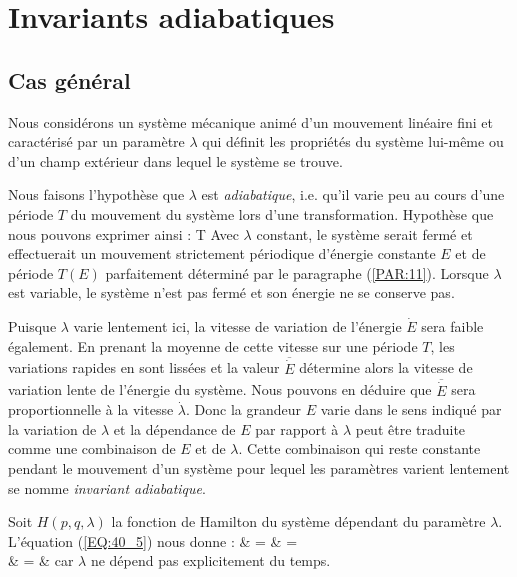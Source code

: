 \section{Invariants adiabatiques}\label{PAR:49}

\subsection{Cas g\'{e}n\'{e}ral}\label{PAR:49_1}

Nous consid\'{e}rons un syst\`{e}me m\'{e}canique anim\'{e} d'un mouvement lin\'{e}aire fini et caract\'{e}ris\'{e} par un param\`{e}tre $\lambda$ qui d\'{e}finit les propri\'{e}t\'{e}s du syst\`{e}me lui-m\^{e}me ou d'un champ ext\'{e}rieur dans lequel le syst\`{e}me se trouve.

Nous faisons l'hypoth\`{e}se que $\lambda$ est \emph{adiabatique}, i.e. qu'il varie peu au cours d'une p\'{e}riode $T$ du mouvement du syst\`{e}me lors d'une transformation. Hypoth\`{e}se que nous pouvons exprimer ainsi :
\be
	T \ll \lambda \label{EQ:49_1}
\ee
Avec $\lambda$ constant, le syst\`{e}me serait ferm\'{e} et effectuerait un mouvement strictement p\'{e}riodique d'\'{e}nergie constante $E$ et de p\'{e}riode $T(E)$ parfaitement d\'{e}termin\'{e} par le paragraphe (\ref{PAR:11}). Lorsque $\lambda$ est variable, le syst\`{e}me n'est pas ferm\'{e} et son \'{e}nergie ne se conserve pas.

Puisque $\lambda$ varie lentement ici, la vitesse de variation de l'\'{e}nergie $\dot{E}$ sera faible \'{e}galement. En prenant la moyenne de cette vitesse sur une p\'{e}riode $T$, les variations rapides en sont liss\'{e}es et la valeur $\overline{\dot{E}}$ d\'{e}termine alors la vitesse de variation lente de l'\'{e}nergie du syst\`{e}me. Nous pouvons en d\'{e}duire que $\overline{\dot{E}}$ sera proportionnelle \`{a} la vitesse $\dot{\lambda}$. Donc la grandeur $E$ varie dans le sens indiqu\'{e} par la variation de $\lambda$ et la d\'{e}pendance de $E$ par rapport \`{a} $\lambda$ peut \^{e}tre traduite comme une combinaison de $E$ et de $\lambda$. Cette combinaison qui reste constante pendant le mouvement d'un syst\`{e}me pour lequel les param\`{e}tres varient lentement se nomme \emph{invariant adiabatique}.

Soit $H(p,q,\lambda)$ la fonction de Hamilton du syst\`{e}me d\'{e}pendant du param\`{e}tre $\lambda$. L'\'{e}quation (\ref{EQ:40_5}) nous donne :
\bea
	 & = &  \Leftrightarrow {} =  \nonumber \\
	\Leftrightarrow {} & = &  \label{EQ:49_2}
\eea
car $\lambda$ ne d\'{e}pend pas explicitement du temps.

